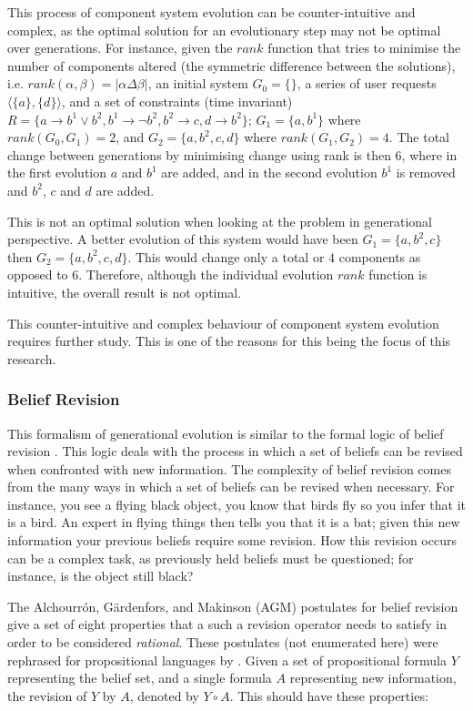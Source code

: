 This process of component system evolution can be counter-intuitive and complex, as the optimal solution for an evolutionary step may not be optimal over generations.
For instance, given the $rank$ function that tries to minimise the number of components altered (the symmetric difference between the solutions), i.e. $rank(\alpha,\beta) = |\alpha \Delta \beta|$,
an initial system $G_0 = \{\}$, a series of user requests $\langle \{a\}, \{d\}\rangle$, 
and a set of constraints (time invariant) $R = \{a \rightarrow b^1 \vee b^2, b^1 \rightarrow \neg b^2, b^2 \rightarrow c, d \rightarrow b^2\}$;
$G_1 = \{a,b^1\}$ where $rank(G_0,G_1) = 2$, and $G_2 = \{a,b^2,c,d\}$ where $rank(G_1,G_2) = 4$.
The total change between generations by minimising change using rank is then $6$, where in the first evolution $a$ and $b^1$ are added, 
and in the second evolution $b^1$ is removed and $b^2$, $c$ and $d$ are added.

This is not an optimal solution when looking at the problem in generational perspective.
A better evolution of this system would have been $G_1 = \{a,b^2,c\}$ then $G_2 = \{a,b^2,c,d\}$.
This would change only a total or $4$ components as opposed to $6$.
Therefore, although the individual evolution $rank$ function is intuitive, the overall result is not optimal.

This counter-intuitive and complex behaviour of component system evolution requires further study.
This is one of the reasons for this being the focus of this research. 

\subsubsection{Belief Revision}
This formalism of generational evolution is similar to the formal logic of belief revision \cite{alchourron1985logic}.
This logic deals with the process in which a set of beliefs can be revised when confronted with new information.
The complexity of belief revision comes from the many ways in which a set of beliefs can be revised when necessary.
For instance, you see a flying black object, you know that birds fly so you infer that it is a bird.
An expert in flying things then tells you that it is a bat; given this new information your previous beliefs require some revision.
How this revision occurs can be a complex task, as previously held beliefs must be questioned; for instance, is the object still black?

The Alchourrón, G\"ardenfors, and Makinson (AGM) \cite{alchourron1985logic} postulates for belief revision give a set of eight properties 
that a such a revision operator needs to satisfy in order to be considered \textit{rational}.
These postulates (not enumerated here) were rephrased for propositional languages by \cite{katsuno1991propositional}. 
Given a set of propositional formula $Y$ representing the belief set, and a single formula $A$ representing new information, the revision of $Y$ by $A$, denoted by $Y \circ A$.
This should have these properties:

